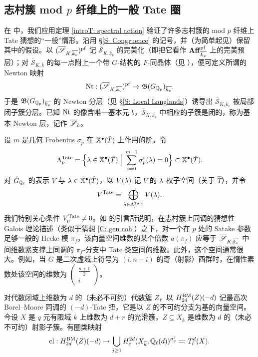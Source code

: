 
\subsection{志村簇 mod $p$ 纤维上的一般 Tate 圈}\label{S: Tate}

在 \cite{Xiao-Zhu-Cycle} 中，我们应用定理 \ref{introT: spectral action} 验证了许多志村簇的 mod $p$ 纤维上 Tate 猜想的“一般”情形。沿用 \S\ref{S: Congruence} 的记号，并（为简单起见）保留其中的假设。以 $(\overline{\mathscr S}_{K,\overline{k_v}})^{\operatorname{pf}}$ 记 $\overline{\mathscr S}_{K,\overline{k_v}}$ 的完美化（即把它看作 ${\mathbf{Aff}}_{\overline{k_v}}^{{\operatorname{pf}}}$ 上的完美预层）；对 $\overline{\mathscr S}_{K,\bar{k}}$ 的每一点附上一个带 $G$-结构的 $F$-同晶体（见 \cite{Kisin-Integral-Model, Xiao-Zhu-Cycle}），便可定义所谓的 Newton 映射
\[
\operatorname{Nt}: (\overline{\mathscr S}_{K,\overline{k_v}})^{\operatorname{pf}}\to {{\mathfrak B}}(G_{{\mathbb Q}_p})_{\overline{k_v}}.
\]
于是 ${{\mathfrak B}}(G_{{\mathbb Q}_p})_{\overline{k_v}}$ 的 Newton 分层（见 \S\ref{S: Local Langlands}）诱导出 $\overline{\mathscr S}_{K,\overline{k_v}}$ 被局部闭子簇分层。已知 $\operatorname{Nt}$ 的像含唯一基本元 $b$，$\overline{\mathscr S}_{K,\overline{k_v}}$ 中相应的子簇是闭的，称为基本 Newton 层，记作 $\overline{{\mathscr S}}_b$。

设 $m$ 是几何 Frobenius $\sigma_p$ 在 $\mathbb{X}^\bullet(\hat{T})$ 上作用的阶。令
\[
\Lambda^{\operatorname{Tate}}_p=\Big\{{\lambda}\in \mathbb{X}^\bullet(\hat T)\; \Big|\; \sum_{i=0}^{m-1} \sigma_p^i({\lambda})=0\Big\}\subset \mathbb{X}^\bullet(\hat T).
\]
对 $\hat G_{{\mathbb Q}_\ell}$ 的表示 $V$ 与 ${\lambda}\in\mathbb{X}^\bullet(\hat T)$，以 $V({\lambda})$ 记 $V$ 的 ${\lambda}$-权子空间（关于 $\hat T$），并令
\[
V^{\operatorname{Tate}}=\bigoplus_{{\lambda}\in\Lambda^{\operatorname{Tate}}_p} V({\lambda}).
\]
我们特别关心条件 $V^{\operatorname{Tate}}_\mu\neq 0$。如 \cite{Xiao-Zhu-Cycle} 的引言所说明，在志村簇上同调的猜想性 Galois 理论描述（类似于猜想 \ref{C: gen coh}）之下，对一个在 $p$ 处的 Satake 参数足够一般的 Hecke 模 $\pi_f$，该向量空间维数的某个倍数 $a(\pi_f)$ 应等于 $\overline{{\mathscr S}}_{K,\overline{k_v}}$ 中间维数紧支撑上同调的 $\pi_f$-分支中 Tate 类空间的维数。此外，这个空间通常很大。例如，当 $G$ 是二次虚域上符号为 $(i,n-i)$ 的奇（射影）酉群时，在惰性素数处该空间的维数为 $\begin{pmatrix}\frac{n+1}{2}\\ i\end{pmatrix}$。

对代数闭域上维数为 $d$ 的（未必不可约）代数簇 $Z$，以 $H^{\operatorname{BM}}_{2d}(Z)(-d)$ 记最高次 Borel--Moore 同调的 $(-d)$-Tate 扭，它是以 $Z$ 的不可约分支为基的向量空间。今设 $X$ 是 $q$ 元有限域 $k$ 上维数为 $d+r$ 的光滑簇，$Z \subseteq X_{\overline k}$ 是维数为 $d$ 的（未必不可约）射影子簇。有圈类映射
\[
{\operatorname{cl}}: H^{\operatorname{BM}}_{2d}(Z)(-d)\to \bigcup_{j\geq 1}H_{c}^{2d}(X_{\overline k}, {\mathbb Q}_\ell(d))^{\sigma_q^j}=:T^d_\ell(X).
\]

